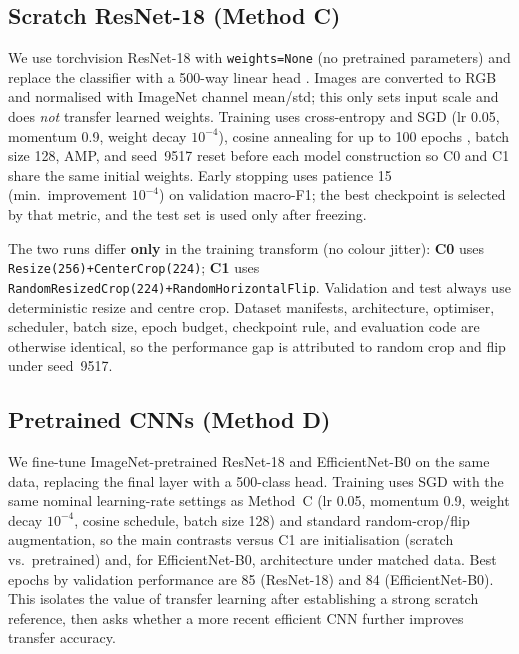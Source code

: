 \documentclass[10pt,twocolumn,letterpaper]{article}
\begin{document}
\subsection{Scratch ResNet-18 (Method C)}
\label{sec:method-c}

We use torchvision ResNet-18 with \texttt{weights=None} (no pretrained
parameters) and replace the classifier with a 500-way linear head
\cite{he2016deep}. Images are converted to RGB and normalised with ImageNet
channel mean/std; this only sets input scale and does \emph{not} transfer
learned weights. Training uses cross-entropy and SGD (lr 0.05, momentum 0.9,
weight decay $10^{-4}$), cosine annealing for up to 100 epochs
\cite{loshchilov2017sgdr}, batch size 128, AMP, and seed~9517 reset before
each model construction so C0 and C1 share the same initial weights. Early
stopping uses patience 15 (min.\ improvement $10^{-4}$) on validation
macro-F1; the best checkpoint is selected by that metric, and the test set is
used only after freezing.

The two runs differ \textbf{only} in the training transform (no colour
jitter): \textbf{C0} uses \texttt{Resize(256)+CenterCrop(224)}; \textbf{C1}
uses \texttt{RandomResizedCrop(224)+RandomHorizontalFlip}. Validation and
test always use deterministic resize and centre crop. Dataset manifests,
architecture, optimiser, scheduler, batch size, epoch budget, checkpoint
rule, and evaluation code are otherwise identical, so the performance gap is
attributed to random crop and flip under seed~9517.

\subsection{Pretrained CNNs (Method D)}
\label{sec:method-d}

We fine-tune ImageNet-pretrained ResNet-18 and EfficientNet-B0
\cite{tan2019efficientnet} on the same data, replacing the final layer with a
500-class head. Training uses SGD with the same nominal learning-rate
settings as Method~C (lr 0.05, momentum 0.9, weight decay $10^{-4}$, cosine
schedule, batch size 128) and standard random-crop/flip augmentation, so the
main contrasts versus C1 are initialisation (scratch vs.\ pretrained) and, for
EfficientNet-B0, architecture under matched data. Best epochs by validation
performance are 85 (ResNet-18) and 84 (EfficientNet-B0). This isolates the
value of transfer learning after establishing a strong scratch reference, then
asks whether a more recent efficient CNN further improves transfer accuracy.
\end{document}
